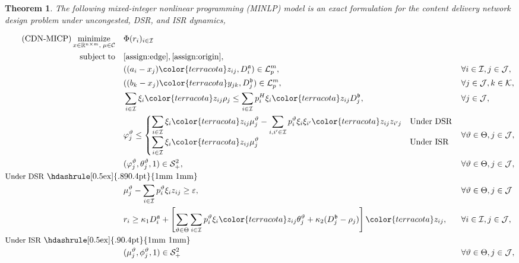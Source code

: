 \documentclass[a4paper,11pt,reqno]{amsart}
\newtheorem{theorem}{Theorem}
\DeclareMathOperator*{\minimize}{minimize}
\DeclareMathOperator{\st}{subject\; to}
\newcommand{\R}{\mathbb{R}}
\newcommand{\LL}{\mathcal{L}}
\renewcommand{\SS}{\mathcal{S}}
\newcommand{\K}{\mathcal{K}}
\newcommand{\I}{\mathcal{I}}
\newcommand{\J}{\mathcal{J}}
\newcommand{\highlight}[1]{{\color{terracota} #1}}
\begin{document}
\begin{theorem}\label{th:general_cdn}
    The following mixed-integer nonlinear programming {\rm (MINLP)} model is an exact formulation for the content delivery network design problem under uncongested, {\rm DSR}, and {\rm ISR} dynamics,

\begin{align*}\label{eq:cnd}\tag{\rm CDN-MICP}
    \minimize_{x\in\R^{n\times m}, \; \mu \in \mathcal{C}} \quad & \Phi(r_i)_{i\in\I} && \\
    \st \quad & \eqref{assign:edge}, \eqref{assign:origin}, &&\\
    & ((a_i - x_j)\highlight{z_{ij}}, D^{\frak a}_i) \in \LL_p^{m}, &&  \forall i \in \I,j\in\J, \\
    & ((b_k - x_j)\highlight{y_{jk}}, D_j^{\frak b}) \in \LL_p^{m}, && \forall j \in \J,k\in\K,\\
    & \sum_{i\in\I}\xi_i\highlight{z_{ij}\rho_j} \leq  \sum_{i\in\I}p_i^H\xi_i\highlight{z_{ij}D_j^{\frak b}}, && \forall j\in \J,\\
    & \varphi^\vartheta_j \leq \begin{cases}
         \displaystyle\sum_{i\in\I}\xi_i\highlight{z_{ij}\mu_j^\vartheta}-  \displaystyle\sum_{i,i'\in\I}p_i^\vartheta\xi_i\xi_{i'}\highlight{z_{ij}z_{i'j}} & \text{Under {\rm DSR}}\\
         \displaystyle\sum_{i\in\I}\xi_i\highlight{z_{ij}\mu_j^\vartheta} & \text{Under {\rm ISR}}
    \end{cases} && \forall \vartheta\in \Theta, j\in\J,\\
    &(\varphi_j^\vartheta,\theta_j^\vartheta, 1) \in \SS^2_+, && \forall \vartheta\in \Theta,j\in \J,\\
    \noalign{
    \noindent {\small Under {\rm DSR}} \hdashrule[0.5ex]{.89\linewidth}{0.4pt}{1mm 1mm}
    }
    & \mu_j^\vartheta-\sum_{i\in\I}p_i^\vartheta\xi_iz_{ij} \geq \varepsilon, && \forall \vartheta\in\Theta, j\in \J\\
    & r_i\geq \kappa_1 D^{\frak a}_i+ \left[\sum_{\vartheta\in\Theta} \sum_{i\in\I}p_i^\vartheta\xi_i\highlight{z_{ij}\theta_j^\vartheta} + \kappa_2(D^{\frak b}_j-\rho_j)\right]\highlight{z_{ij}}, & & \forall i\in\I,j\in \J,\\
    \noalign{
    \noindent {\small Under {\rm ISR}} \hdashrule[0.5ex]{.9\linewidth}{0.4pt}{1mm 1mm}
    }
    & (\mu_j^\vartheta, \phi_j^\vartheta,1)\in \SS^2_+ &&  \forall \vartheta\in\Theta,j\in \J,\\

\end{align*}
\end{theorem}
\end{document}
